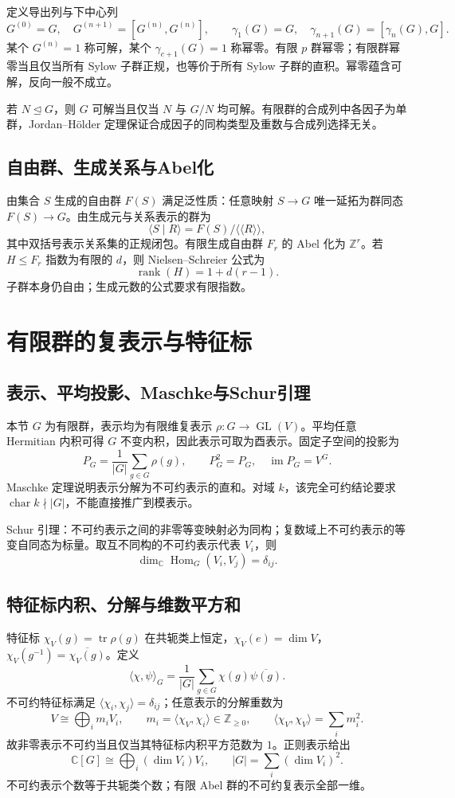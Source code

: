 \documentclass[../main.tex]{subfiles}
\begin{document}
定义导出列与下中心列
\[
G^{(0)}=G,\quad G^{(n+1)}=[G^{(n)},G^{(n)}],\qquad
\gamma_1(G)=G,\quad\gamma_{n+1}(G)=[\gamma_n(G),G].
\]
某个 $G^{(n)}=1$ 称可解，某个 $\gamma_{c+1}(G)=1$ 称幂零。有限 $p$ 群幂零；有限群幂零当且仅当所有 Sylow 子群正规，也等价于所有 Sylow 子群的直积。幂零蕴含可解，反向一般不成立。

若 $N\trianglelefteq G$，则 $G$ 可解当且仅当 $N$ 与 $G/N$ 均可解。有限群的合成列中各因子为单群，Jordan--Hölder 定理保证合成因子的同构类型及重数与合成列选择无关。

\subsection{自由群、生成关系与Abel化}
由集合 $S$ 生成的自由群 $F(S)$ 满足泛性质：任意映射 $S\to G$ 唯一延拓为群同态 $F(S)\to G$。由生成元与关系表示的群为
\[
\langle S\mid R\rangle=F(S)/\langle\!\langle R\rangle\!\rangle,
\]
其中双括号表示关系集的正规闭包。有限生成自由群 $F_r$ 的 Abel 化为 $\mathbb Z^r$。若 $H\le F_r$ 指数为有限的 $d$，则 Nielsen--Schreier 公式为
\[
\operatorname{rank}(H)=1+d(r-1).
\]
子群本身仍自由；生成元数的公式要求有限指数。

\section{有限群的复表示与特征标}
\subsection{表示、平均投影、Maschke与Schur引理}
本节 $G$ 为有限群，表示均为有限维复表示 $\rho:G\to\operatorname{GL}(V)$。平均任意 Hermitian 内积可得 $G$ 不变内积，因此表示可取为酉表示。固定子空间的投影为
\[
P_G=\frac1{|G|}\sum_{g\in G}\rho(g),\qquad
P_G^2=P_G,\quad\operatorname{im}P_G=V^G.
\]
Maschke 定理说明表示分解为不可约表示的直和。对域 $k$，该完全可约结论要求 $\operatorname{char}k\nmid|G|$，不能直接推广到模表示。

Schur 引理：不可约表示之间的非零等变映射必为同构；复数域上不可约表示的等变自同态为标量。取互不同构的不可约表示代表 $V_i$，则
\[
\dim_{\mathbb C}\operatorname{Hom}_G(V_i,V_j)=\delta_{ij}.
\]

\subsection{特征标内积、分解与维数平方和}
特征标 $\chi_V(g)=\operatorname{tr}\rho(g)$ 在共轭类上恒定，$\chi_V(e)=\dim V$，$\chi_V(g^{-1})=\overline{\chi_V(g)}$。定义
\[
\langle\chi,\psi\rangle_G=\frac1{|G|}\sum_{g\in G}\chi(g)\overline{\psi(g)}.
\]
不可约特征标满足 $\langle\chi_i,\chi_j\rangle=\delta_{ij}$；任意表示的分解重数为
\[
V\cong\bigoplus_i m_iV_i,\qquad
m_i=\langle\chi_V,\chi_i\rangle\in\mathbb Z_{\ge0},\qquad
\langle\chi_V,\chi_V\rangle=\sum_i m_i^2.
\]
故非零表示不可约当且仅当其特征标内积平方范数为 $1$。正则表示给出
\[
\mathbb C[G]\cong\bigoplus_i(\dim V_i)V_i,\qquad
|G|=\sum_i(\dim V_i)^2.
\]
不可约表示个数等于共轭类个数；有限 Abel 群的不可约复表示全部一维。
\end{document}
